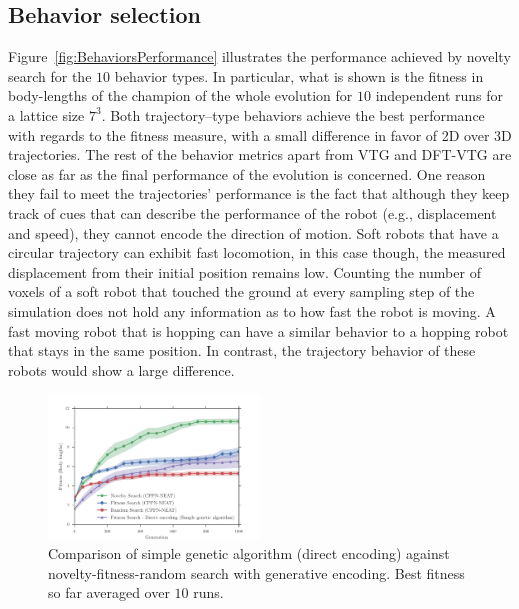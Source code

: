 \documentclass{sig-alternate}
\begin{document}
\subsection{Behavior selection} 

Figure~\ref{fig:BehaviorsPerformance} illustrates the performance achieved by novelty search for the $10$ behavior types. In particular, what is shown is the fitness in body-lengths of the champion of the whole evolution for $10$ independent runs for a lattice size $7^3$. Both trajectory--type behaviors achieve the best performance with regards to the fitness measure, with a small difference in favor of 2D over 3D trajectories. The rest of the behavior metrics apart from VTG and DFT-VTG are close as far as the final performance of the evolution is concerned. One reason they fail to meet the trajectories' performance is the fact that although they keep track of cues that can describe the performance of the robot (e.g., displacement and speed), they cannot encode the direction of motion. Soft robots that have a circular trajectory can exhibit fast locomotion, in this case though, the measured displacement from their initial position remains low. Counting the number of voxels of a soft robot that touched the ground at every sampling step of the simulation does not hold any information as to how fast the robot is moving. A fast moving robot that is hopping can have a similar behavior to a hopping robot that stays in the same position. In contrast, the trajectory behavior of these robots would show a large difference.


\begin{figure}[t!]
\centering
\includegraphics[width=0.5\textwidth]{../Figures/Results/FitNovRandomDirectSize5.pdf}
\caption{Comparison of simple genetic algorithm (direct encoding) against novelty-fitness-random search with generative encoding. Best fitness so far averaged over $10$ runs.}
\label{fig:FitNovRandomDirectSize5}
\end{figure}
\end{document}
